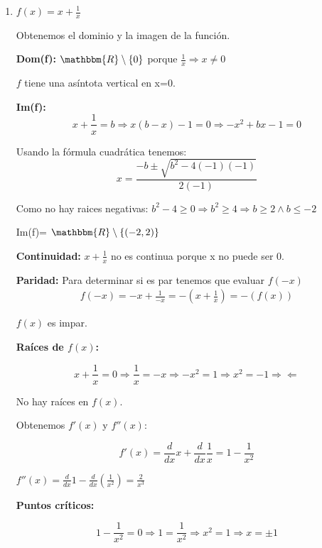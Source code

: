 \documentclass[12pt]{article}
\begin{document}
\begin{enumerate}[\hspace{9px} a)]
    \item \(f(x)=x+\displaystyle\frac{1}{x}\)\medskip
    
        Obtenemos el dominio y la imagen de la función.\medskip

        \textbf{Dom(f):} $\mathbbm{R}\setminus\{0\}$ porque \(\frac{1}{x} \Rightarrow x \neq 0 \)\medskip

        $f$ tiene una as\'intota vertical en x=0. \medskip

        \textbf{Im(f):}
        \[x+\displaystyle\frac{1}{x}=b \Rightarrow x(b-x)-1=0 \Rightarrow -x^2+bx-1=0\]

        Usando la f\'ormula cuadr\'atica tenemos:
        \[x=\frac{-b\pm\sqrt{b^2-4(-1)(-1)}}{2(-1)}\]

        Como no hay raices negativas: \(b^2-4 \geq 0 \Rightarrow b^2 \geq 4 \Rightarrow b \geq 2 \wedge b \leq -2\)\medskip

        Im(f)= $\mathbbm{R}\setminus\{(-2,2)\}$

        \textbf{Continuidad:}
        \(x+\displaystyle\frac{1}{x}\) no es continua porque x no puede ser 0.\medskip

        \textbf{Paridad:}
        Para determinar si es par tenemos que evaluar $f(-x)$
        \begin{align*}
            f(-x)=-x+\displaystyle\frac{1}{-x}= -(x+\frac{1}{x}) = -(f(x))
        \end{align*}
        
        $f(x)$ es impar.\medskip

        \textbf{Ra\'ices de $f(x)$:}\medskip
        
        \[x+\displaystyle\frac{1}{x}=0 \Rightarrow \frac{1}{x}=-x \Rightarrow -x^2=1 \Rightarrow x^2=-1 \Rightarrow\!\Leftarrow\]

        No hay ra\'ices en $f(x)$.

        Obtenemos $f'(x)$ y $f''(x)$:

        \[f'(x) = \displaystyle\frac{d}{dx}x+\frac{d}{dx}\frac{1}{x}=1-\frac{1}{x^2}\]

        \(f''(x) = \displaystyle\frac{d}{dx}1-\frac{d}{dx}\left(\frac{1}{x^2}\right) = \frac{2}{x^3}\)\medskip

        \textbf{Puntos cr\'iticos:}\medskip

        \[1-\displaystyle\frac{1}{x^2} = 0 \Rightarrow 1 = \frac{1}{x^2} \Rightarrow x^2=1 \Rightarrow x=\pm1\]


\end{enumerate}
\end{document}

